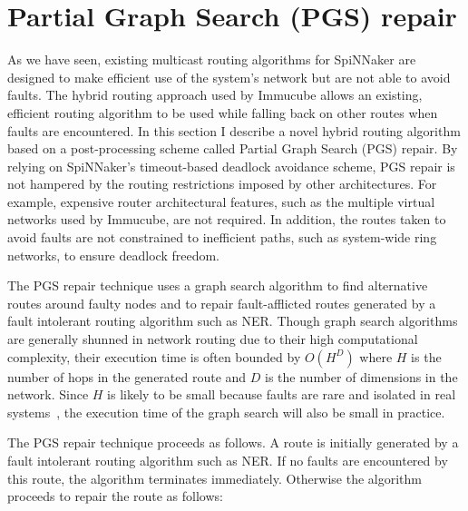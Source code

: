 	\section{Partial Graph Search (PGS) repair}
		
		As we have seen, existing multicast routing algorithms for SpiNNaker are
		designed to make efficient use of the system's network but are not able to
		avoid faults. The hybrid routing approach used by Immucube allows an
		existing, efficient routing algorithm to be used while falling back on
		other routes when faults are encountered.  In this section I describe a
		novel hybrid routing algorithm based on a post-processing scheme called
		Partial Graph Search (PGS) repair. By relying on SpiNNaker's timeout-based
		deadlock avoidance scheme, PGS repair is not hampered by the routing
		restrictions imposed by other architectures. For example, expensive router
		architectural features, such as the multiple virtual networks used by
		Immucube, are not required. In addition, the routes taken to avoid faults
		are not constrained to inefficient paths, such as system-wide ring
		networks, to ensure deadlock freedom.
		
		The PGS repair technique uses a graph search algorithm to find alternative
		routes around faulty nodes and to repair fault-afflicted routes generated
		by a fault intolerant routing algorithm such as NER. Though graph search
		algorithms are generally shunned in network routing due to their high
		computational complexity, their execution time is often bounded by $O(H^D)$
		where $H$ is the number of hops in the generated route and $D$ is the
		number of dimensions in the network.  Since $H$ is likely to be small
		because faults are rare and isolated in real
		systems~\cite{gara05,alverson12}, the execution time of the graph search
		will also be small in practice.
		
		The PGS repair technique proceeds as follows. A route is initially
		generated by a fault intolerant routing algorithm such as NER. If no faults
		are encountered by this route, the algorithm terminates immediately.
		Otherwise the algorithm proceeds to repair the route as follows:
		
